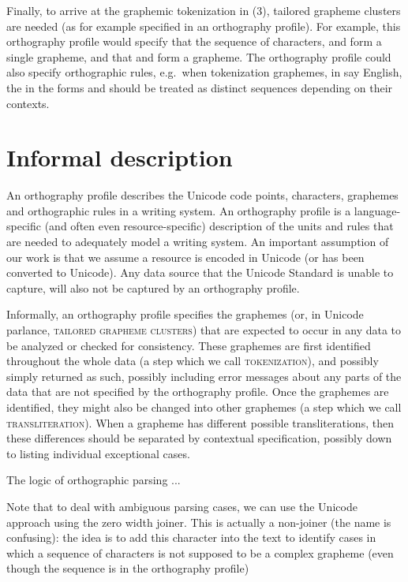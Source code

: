 Finally, to arrive at the graphemic tokenization in
(3), tailored grapheme clusters are needed (as for example specified in an
orthography profile). For example, this orthography profile would specify that
the sequence of characters, and form a single grapheme, and that and form a
grapheme. The orthography profile could also specify orthographic rules,
e.g.~when tokenization graphemes, in say English, the in the forms and should be
treated as distinct sequences depending on their contexts.

\section{Informal description}
\label{informal-description-of-orthography-profiles}

An orthography profile describes the Unicode code points, characters, graphemes
and orthographic rules in a writing system. An orthography profile is a
language-specific (and often even resource-specific) description of the units
and rules that are needed to adequately model a writing system. An important
assumption of our work is that we assume a resource is encoded in Unicode (or
has been converted to Unicode). Any data source that the Unicode Standard is
unable to capture, will also not be captured by an orthography profile.

Informally, an orthography profile specifies the graphemes (or, in Unicode
parlance, \textsc{tailored grapheme clusters}) that are expected to occur in any
data to be analyzed or checked for consistency. These graphemes are first
identified throughout the whole data (a step which we call
\textsc{tokenization}), and possibly simply returned as such, possibly including
error messages about any parts of the data that are not specified by the
orthography profile. Once the graphemes are identified, they might also be
changed into other graphemes (a step which we call \textsc{transliteration}).
When a grapheme has different possible transliterations, then these differences
should be separated by contextual specification, possibly down to listing
individual exceptional cases.

The logic of orthographic parsing ...

Note that to deal with ambiguous parsing cases, we can use the Unicode approach
using the zero width joiner. This is actually a non-joiner (the name is
confusing): the idea is to add this character into the text to identify cases in
which a sequence of characters is not supposed to be a complex grapheme (even
though the sequence is in the orthography profile)


